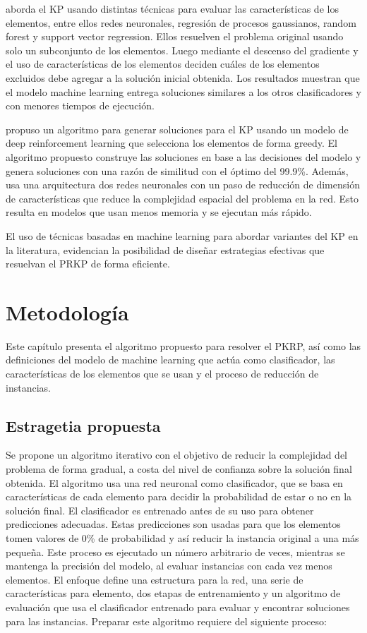 \documentclass[spanish, a4paper, 12pt, openany,final]{book}
\begin{document}
\cite{rezoug_application_2022} aborda el KP usando distintas técnicas para evaluar las características de los elementos, entre ellos redes neuronales, regresión de procesos gaussianos, random forest y support vector regression. Ellos resuelven el problema original usando solo un subconjunto de los elementos. Luego mediante el descenso del gradiente y el uso de características de los elementos deciden cuáles de los elementos excluidos debe agregar a la solución inicial obtenida. Los resultados muestran que el modelo machine learning entrega soluciones similares a los otros clasificadores y con menores tiempos de ejecución.

\cite{afshar_state_2020} propuso un algoritmo para generar soluciones para el KP usando un modelo de deep reinforcement learning que selecciona los elementos de forma greedy. El algoritmo propuesto construye las soluciones en base a las decisiones del modelo y genera soluciones con una razón de similitud con el óptimo del 99.9\%. Además, usa una arquitectura dos redes neuronales con un paso de reducción de dimensión de características que reduce la complejidad espacial del problema en la red. Esto resulta en modelos que usan menos memoria y se ejecutan más rápido.

El uso de técnicas basadas en machine learning para abordar variantes del KP en la literatura, evidencian la posibilidad de diseñar estrategias efectivas que resuelvan el PRKP de forma eficiente.
 

\chapter{Metodología}

Este capítulo presenta el algoritmo propuesto para resolver el PKRP, así como las definiciones del modelo de machine learning que actúa como clasificador, las características de los elementos que se usan y el proceso de reducción de instancias.

\section{Estragetia propuesta}

Se propone un algoritmo iterativo con el objetivo de reducir la complejidad del problema de forma gradual, a costa del nivel de confianza sobre la solución final obtenida. El algoritmo usa una red neuronal como clasificador, que se basa en características de cada elemento para decidir la probabilidad de estar o no en la solución final. El clasificador es entrenado antes de su uso para obtener predicciones adecuadas. Estas predicciones son usadas para que los elementos tomen valores de 0\% de probabilidad y así reducir la instancia original a una más pequeña. Este proceso es ejecutado un número arbitrario de veces, mientras se mantenga la precisión del modelo, al evaluar instancias con cada vez menos elementos. El enfoque define una estructura para la red, una serie de características para elemento, dos etapas de entrenamiento y un algoritmo de evaluación que usa el clasificador entrenado para evaluar y encontrar soluciones para las instancias. Preparar este algoritmo requiere del siguiente proceso:
\end{document}
